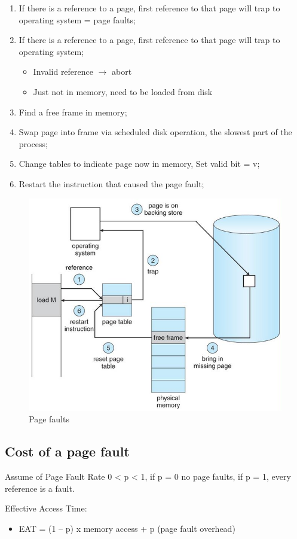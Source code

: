 \begin{enumerate}
    \item If there is a reference to a page, first reference to that page will trap to operating system = page faults;
    \item If there is a reference to a page, first reference to that page will trap to operating system;
    \begin{itemize}
        \item[] Invalid reference $\to$ abort
        \item[] Just not in memory, need to be loaded from disk
    \end{itemize}
    \item Find a free frame in memory;
    \item Swap page into frame via scheduled disk operation, the slowest part of the process;
    \item Change tables to indicate page now in memory, Set valid bit = v;
    \item Restart the instruction that caused the page fault;
\end{enumerate}

\begin{figure}[htbp]
    \centering
    \includegraphics[width=0.6\linewidth]{img/bnetg.png}
    \caption{Page faults}
\end{figure}

\subsection{Cost of a page fault}
Assume of Page Fault Rate 0 < p < 1, if p = 0 no page faults, if p = 1, every reference is a fault.

Effective Access Time:

\begin{itemize}
    \centering 
    \item[] EAT = (1 – p) x memory access + p (page fault overhead)
\end{itemize}

